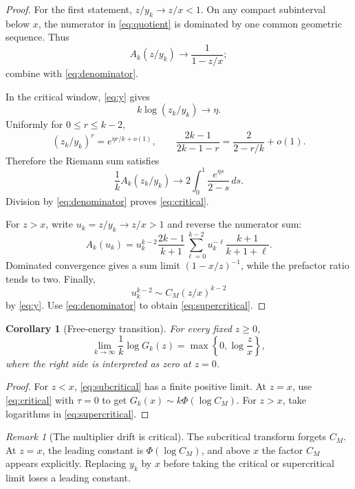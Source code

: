 \documentclass[11pt]{article}
\newtheorem{corollary}[theorem]{Corollary}
\theoremstyle{remark}
\newtheorem{remark}[theorem]{Remark}
\begin{document}
\begin{proof}
For the first statement, $z/y_k\to z/x<1$.  On any compact subinterval below
$x$, the numerator in \eqref{eq:quotient} is dominated by one common
geometric sequence.  Thus
\[
 A_k(z/y_k)\longrightarrow\frac1{1-z/x};
\]
combine with \eqref{eq:denominator}.

In the critical window, \eqref{eq:y} gives
\begin{equation}\label{eq:critical-u}
 k\log(z_k/y_k)\longrightarrow\eta.
\end{equation}
Uniformly for $0\le r\le k-2$,
\[
 (z_k/y_k)^r=e^{\eta r/k+o(1)},
 \qquad
 \frac{2k-1}{2k-1-r}
 =\frac{2}{2-r/k}+o(1).
\]
Therefore the Riemann sum satisfies
\[
 \frac1kA_k(z_k/y_k)
 \longrightarrow2\int_0^1\frac{e^{\eta s}}{2-s}\,ds.
\]
Division by \eqref{eq:denominator} proves \eqref{eq:critical}.

For $z>x$, write $u_k=z/y_k\to z/x>1$ and reverse the numerator sum:
\begin{equation}\label{eq:reverse-super}
 A_k(u_k)=u_k^{k-2}\frac{2k-1}{k+1}
 \sum_{\ell=0}^{k-2}u_k^{-\ell}\frac{k+1}{k+1+\ell}.
\end{equation}
Dominated convergence gives a sum limit $(1-x/z)^{-1}$, while the prefactor
ratio tends to two.  Finally,
\begin{equation}\label{eq:super-power}
 u_k^{k-2}\sim C_M(z/x)^{k-2}
\end{equation}
by \eqref{eq:y}.  Use \eqref{eq:denominator} to obtain
\eqref{eq:supercritical}.
\end{proof}

\begin{corollary}[Free-energy transition]\label{cor:free-energy}
For every fixed $z\ge0$,
\begin{equation}\label{eq:free-energy}
 \boxed{
 \lim_{k\to\infty}\frac1k\log G_k(z)
 =\max\left\{0,\log\frac zx\right\},}
\end{equation}
where the right side is interpreted as zero at $z=0$.
\end{corollary}

\begin{proof}
For $z<x$, \eqref{eq:subcritical} has a finite positive limit.  At $z=x$,
use \eqref{eq:critical} with $\tau=0$ to get $G_k(x)\sim k\Phi(\log C_M)$.
For $z>x$, take logarithms in \eqref{eq:supercritical}.
\end{proof}

\begin{remark}[The multiplier drift is critical]
The subcritical transform forgets $C_M$.  At $z=x$, the leading constant is
$\Phi(\log C_M)$, and above $x$ the factor $C_M$ appears explicitly.  Replacing
$y_k$ by $x$ before taking the critical or supercritical limit loses a leading
constant.
\end{remark}
\end{document}
